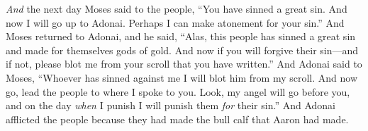 \begin{biblechapter}
\verse \textit{And} the next day Moses said to the people, “You have sinned a great sin. And now I will go up to Adonai. Perhaps I can make atonement for your sin.”
\verse And Moses returned to Adonai, and he said, “Alas, this people has sinned a great sin and made for themselves gods of gold.
\verse And now if you will forgive their sin—and if not, please blot me from your scroll that you have written.”
\verse And Adonai said to Moses, “Whoever has sinned against me I will blot him from my scroll.
\verse And now go, lead the people to where I spoke to you. Look, my angel will go before you, and on the day \textit{when} I punish I will punish them \textit{for} their sin.”
\verse And Adonai afflicted the people because they had made the bull calf that Aaron had made.
\end{biblechapter}

